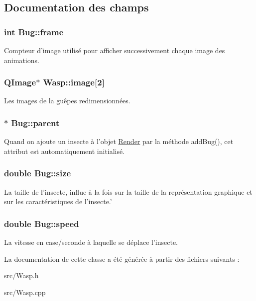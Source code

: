 \subsection{Documentation des champs}
\hypertarget{classBug_ad7e3597cf049f1051be94fcaf2fd3598}{
\subsubsection[{frame}]{\setlength{\rightskip}{0pt plus 5cm}int {\bf Bug::frame}}}
\label{classBug_ad7e3597cf049f1051be94fcaf2fd3598}
Compteur d'image utilisé pour afficher successivement chaque image des animations. \hypertarget{classWasp_abdd2e9eb377bb31907494f72067691f8}{
\subsubsection[{image}]{\setlength{\rightskip}{0pt plus 5cm}QImage$\ast$ {\bf Wasp::image}\mbox{[}2\mbox{]}}}
\label{classWasp_abdd2e9eb377bb31907494f72067691f8}
Les images de la guêpes redimensionnées. \hypertarget{classBug_a7a93aae4e4b7a215c94ff85d0bd6e26d}{
\subsubsection[{parent}]{$\ast$ {\bf Bug::parent}}}
\label{classBug_a7a93aae4e4b7a215c94ff85d0bd6e26d}
Quand on ajoute un insecte à l'objet \hyperlink{classRender}{Render} par la méthode addBug(), cet attribut est automatiquement initialisé. \hypertarget{classBug_a27a0f0b84d15525e409955509e6e3c42}{
\subsubsection[{size}]{\setlength{\rightskip}{0pt plus 5cm}double {\bf Bug::size}}}
\label{classBug_a27a0f0b84d15525e409955509e6e3c42}
La taille de l'insecte, influe à la fois sur la taille de la représentation graphique et sur les caractéristiques de l'insecte.' \hypertarget{classBug_a13b95fbf23748ea853b01bfd0b0e7fc8}{
\subsubsection[{speed}]{\setlength{\rightskip}{0pt plus 5cm}double {\bf Bug::speed}}}
\label{classBug_a13b95fbf23748ea853b01bfd0b0e7fc8}
La vitesse en case/seconde à laquelle se déplace l'insecte. 

La documentation de cette classe a été générée à partir des fichiers suivants :\begin{DoxyCompactItemize}
\item 
src/Wasp.h\item 
src/Wasp.cpp\end{DoxyCompactItemize}
